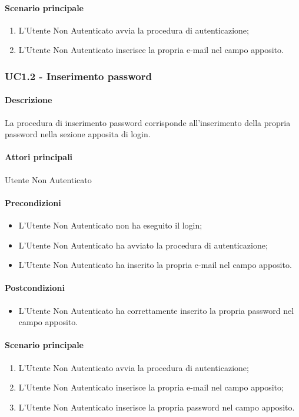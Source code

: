 \paragraph*{Scenario principale}
\begin{enumerate}
  \item L’Utente Non Autenticato avvia la procedura di autenticazione;
  \item L’Utente Non Autenticato inserisce la propria e-mail nel campo apposito.  
\end{enumerate}


\subsubsection{UC1.2 - Inserimento password}\label{UC1point2}
\paragraph*{Descrizione}
La procedura di inserimento password corrisponde all’inserimento della propria password nella sezione apposita di login.

\paragraph*{Attori principali}
Utente Non Autenticato

\paragraph*{Precondizioni}
\begin{itemize}
  \item L’Utente Non Autenticato non ha eseguito il login;
  \item L’Utente Non Autenticato ha avviato la procedura di autenticazione;
  \item L’Utente Non Autenticato ha inserito la propria e-mail nel campo apposito.
\end{itemize}

\paragraph*{Postcondizioni}
\begin{itemize}
  \item L’Utente Non Autenticato ha correttamente inserito la propria password nel campo apposito.
\end{itemize}

\paragraph*{Scenario principale}
\begin{enumerate}
  \item L’Utente Non Autenticato avvia la procedura di autenticazione;
  \item L’Utente Non Autenticato inserisce la propria e-mail nel campo apposito;
  \item L’Utente Non Autenticato inserisce la propria password nel campo apposito.  
\end{enumerate}
